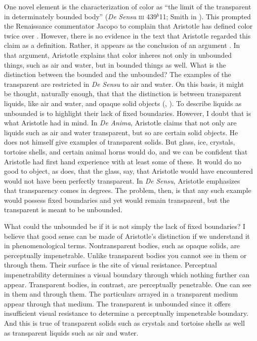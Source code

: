 One novel element is the characterization of color as ``the limit of the transparent in determinately bounded body'' (\emph{De Sensu} \textsc{iii} 439\( ^{b} \)11; Smith in \citealt[8]{Barnes:1984uq}). This prompted the Renaissance commentator Jacopo \citet{Zabarella:1605kx} to complain that Aristotle has defined color twice over \citep{Broackes:1999uq}. However, there is no evidence in the text that Aristotle regarded this claim as a definition. Rather, it appears as the conclusion of an argument \citep[65]{Broackes:1999uq}. In that argument, Aristotle explains that color inheres not only in unbounded things, such as air and water, but in bounded things as well. What is the distinction between the bounded and the unbounded? The examples of the transparent are restricted in \emph{De Sensu} to air and water. On this basis, it might be thought, naturally enough, that that the distinction is between transparent liquids, like air and water, and opaque solid objects (\citealt[59]{Broackes:1999uq}, \citealt[131]{Sorabji:2004fk}). To describe liquids as unbounded is to highlight their lack of fixed boundaries. However, I doubt that is what Aristotle had in mind. In \emph{De Anima}, Aristotle claims that not only are liquids such as air and water transparent, but so are certain solid objects. He does not himself give examples of transparent solids. But glass, ice, crystals, tortoise shells, and certain animal horns would do, and we can be confident that Aristotle had first hand experience with at least some of these. It would do no good to object, as \citet[131]{Sorabji:2004fk} does, that the glass, say, that Aristotle would have encountered would not have been perfectly transparent. In \emph{De Sensu}, Aristotle emphasizes that transparency comes in degrees. The problem, then, is that any such example would possess fixed boundaries and yet would remain transparent, but the transparent is meant to be unbounded. 

What could the unbounded be if it is not simply the lack of fixed boundaries? I believe that good sense can be made of Aristotle's distinction if we understand it in phenomenological terms. Nontransparent bodies, such as opaque solids, are perceptually impenetrable. Unlike transparent bodies you cannot see in them or through them. Their surface is the site of visual resistance. Perceptual impenetrability determines a visual boundary through which nothing further can appear. Transparent bodies, in contrast, are perceptually penetrable. One can see in them and through them. The particulars arrayed in a transparent medium appear through that medium. The transparent is unbounded since it offers insufficient visual resistance to determine a perceptually impenetrable boundary. And this is true of transparent solids such as crystals and tortoise shells as well as transparent liquids such as air and water.


